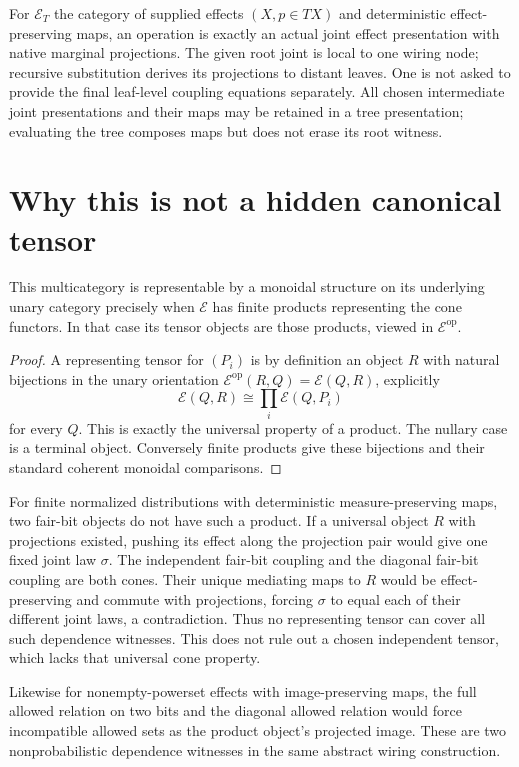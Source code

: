 \documentclass[11pt]{article}
\begin{document}
For $\mathcal E_T$ the category of supplied effects $(X,p\in TX)$ and deterministic effect-preserving maps, an operation is exactly an actual joint effect presentation with native marginal projections. The given root joint is local to one wiring node; recursive substitution derives its projections to distant leaves. One is not asked to provide the final leaf-level coupling equations separately. All chosen intermediate joint presentations and their maps may be retained in a tree presentation; evaluating the tree composes maps but does not erase its root witness.

\section{Why this is not a hidden canonical tensor}
\begin{proposition}
This multicategory is representable by a monoidal structure on its underlying unary category precisely when $\mathcal E$ has finite products representing the cone functors. In that case its tensor objects are those products, viewed in $\mathcal E^{\mathrm{op}}$.
\end{proposition}
\begin{proof}
A representing tensor for $(P_i)$ is by definition an object $R$ with natural bijections
in the unary orientation $\mathcal E^{\mathrm{op}}(R,Q)=\mathcal E(Q,R)$, explicitly
\[
 \mathcal E(Q,R)\cong\prod_i\mathcal E(Q,P_i)
\]
for every $Q$. This is exactly the universal property of a product. The nullary case is a terminal object. Conversely finite products give these bijections and their standard coherent monoidal comparisons.
\end{proof}

For finite normalized distributions with deterministic measure-preserving maps, two fair-bit objects do not have such a product. If a universal object $R$ with projections existed, pushing its effect along the projection pair would give one fixed joint law $\sigma$. The independent fair-bit coupling and the diagonal fair-bit coupling are both cones. Their unique mediating maps to $R$ would be effect-preserving and commute with projections, forcing $\sigma$ to equal each of their different joint laws, a contradiction. Thus no representing tensor can cover all such dependence witnesses. This does not rule out a chosen independent tensor, which lacks that universal cone property.

Likewise for nonempty-powerset effects with image-preserving maps, the full allowed relation on two bits and the diagonal allowed relation would force incompatible allowed sets as the product object's projected image. These are two nonprobabilistic dependence witnesses in the same abstract wiring construction.
\end{document}
